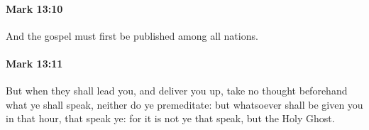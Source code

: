 		\paragraph{Mark 13:10} %
			\label{MARK-13-10}

			And the gospel must first be published among all nations.

			\begin{framed}
			\scriptsize
				\begin{compactdesc}
					\item[SBLG] 
				\end{compactdesc}
			\end{framed}

		\paragraph{Mark 13:11} %
			\label{MARK-13-11}

			But when they shall lead you, and deliver you up, take no thought beforehand what ye shall speak, neither do ye premeditate: but whatsoever shall be given you in that hour, that speak ye: for it is not ye that speak, but the Holy Ghost.

